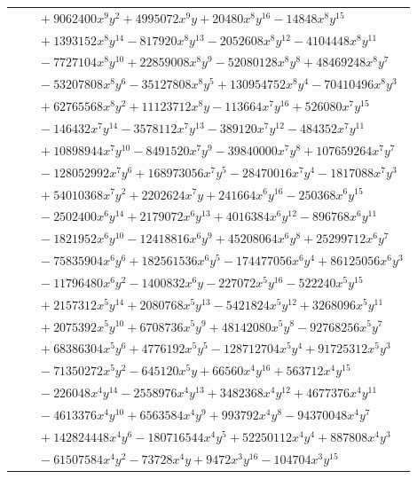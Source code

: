 \documentclass[11pt]{article}
\begin{document}
\begin{longtable}{@{}ll@{}}
 & $\quad +9062400x^{9}y^{2}+4995072x^{9}y+20480x^{8}y^{16}-14848x^{8}y^{15}$\\
 & $\quad +1393152x^{8}y^{14}-817920x^{8}y^{13}-2052608x^{8}y^{12}-4104448x^{8}y^{11}$\\
 & $\quad -7727104x^{8}y^{10}+22859008x^{8}y^{9}-52080128x^{8}y^{8}+48469248x^{8}y^{7}$\\
 & $\quad -53207808x^{8}y^{6}-35127808x^{8}y^{5}+130954752x^{8}y^{4}-70410496x^{8}y^{3}$\\
 & $\quad +62765568x^{8}y^{2}+11123712x^{8}y-113664x^{7}y^{16}+526080x^{7}y^{15}$\\
 & $\quad -146432x^{7}y^{14}-3578112x^{7}y^{13}-389120x^{7}y^{12}-484352x^{7}y^{11}$\\
 & $\quad +10898944x^{7}y^{10}-8491520x^{7}y^{9}-39840000x^{7}y^{8}+107659264x^{7}y^{7}$\\
 & $\quad -128052992x^{7}y^{6}+168973056x^{7}y^{5}-28470016x^{7}y^{4}-1817088x^{7}y^{3}$\\
 & $\quad +54010368x^{7}y^{2}+2202624x^{7}y+241664x^{6}y^{16}-250368x^{6}y^{15}$\\
 & $\quad -2502400x^{6}y^{14}+2179072x^{6}y^{13}+4016384x^{6}y^{12}-896768x^{6}y^{11}$\\
 & $\quad -1821952x^{6}y^{10}-12418816x^{6}y^{9}+45208064x^{6}y^{8}+25299712x^{6}y^{7}$\\
 & $\quad -75835904x^{6}y^{6}+182561536x^{6}y^{5}-174477056x^{6}y^{4}+86125056x^{6}y^{3}$\\
 & $\quad -11796480x^{6}y^{2}-1400832x^{6}y-227072x^{5}y^{16}-522240x^{5}y^{15}$\\
 & $\quad +2157312x^{5}y^{14}+2080768x^{5}y^{13}-5421824x^{5}y^{12}+3268096x^{5}y^{11}$\\
 & $\quad +2075392x^{5}y^{10}+6708736x^{5}y^{9}+48142080x^{5}y^{8}-92768256x^{5}y^{7}$\\
 & $\quad +68386304x^{5}y^{6}+4776192x^{5}y^{5}-128712704x^{5}y^{4}+91725312x^{5}y^{3}$\\
 & $\quad -71350272x^{5}y^{2}-645120x^{5}y+66560x^{4}y^{16}+563712x^{4}y^{15}$\\
 & $\quad -226048x^{4}y^{14}-2558976x^{4}y^{13}+3482368x^{4}y^{12}+4677376x^{4}y^{11}$\\
 & $\quad -4613376x^{4}y^{10}+6563584x^{4}y^{9}+993792x^{4}y^{8}-94370048x^{4}y^{7}$\\
 & $\quad +142824448x^{4}y^{6}-180716544x^{4}y^{5}+52250112x^{4}y^{4}+887808x^{4}y^{3}$\\
 & $\quad -61507584x^{4}y^{2}-73728x^{4}y+9472x^{3}y^{16}-104704x^{3}y^{15}$\\

\end{longtable}
\end{document}
